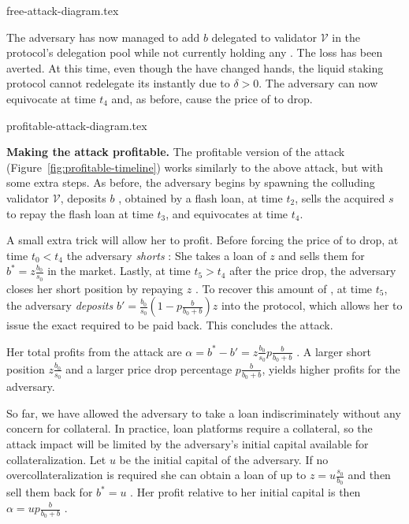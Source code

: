 \iflncs
  {free-attack-diagram.tex}
\fi

The adversary has now managed to add $b$ \asset delegated to validator $\mathcal{V}$
in the protocol's delegation pool while not currently holding
any \stasset. The loss has been averted.
At this time, even though the
\stassets have changed hands, the liquid staking protocol cannot redelegate
its \assets instantly due to $\delta > 0$.
The adversary can now equivocate at time $t_4$ and, as before, cause the
price of \stasset to drop.

{profitable-attack-diagram.tex}

\noindent
\textbf{Making the attack profitable.}
The profitable version of the attack (Figure~\ref{fig:profitable-timeline}) works similarly to the above
attack, but with some extra steps. As before, the adversary begins by spawning the
colluding validator $\mathcal{V}$, deposits $b$ \asset, obtained by a flash loan, at time $t_2$,
sells the acquired $s$ \stasset to repay the flash loan at time $t_3$, and equivocates at time $t_4$.


A small extra trick will allow her to profit.
Before forcing the price of \stasset to drop, at time $t_0 < t_4$
the adversary \emph{shorts}
\stasset: She takes a loan of $z$ \stassets and
sells them for $b^* = z \frac{b_0}{s_0}$ \asset in the market.
Lastly, at time $t_5 > t_4$ after the price drop, the adversary closes her short position by repaying $z$
\stasset.
To recover this amount of \stasset, at time $t_5$, the adversary \emph{deposits}
$b' = \frac{b_0}{s_0}(1 - p\frac{b}{b_0 + b}) z$ \asset
into the protocol, which allows her to issue the exact required \stasset
to be paid back. This concludes the attack.

Her total profits from the attack are
$\alpha = b^* - b' = z \frac{b_0}{s_0} p \frac{b}{b_0 + b}$ \asset.
A larger short position $z \frac{b_0}{s_0}$ and a larger
\stasset price drop percentage $p \frac{b}{b_0 + b}$, yields higher profits for the adversary.

So far, we have allowed the adversary to take a loan indiscriminately without
any concern for collateral. In practice, loan platforms
require a collateral, so the attack impact will be limited by the adversary's
initial capital available for collateralization.
Let $u$ \asset be the initial capital of the adversary.
If no overcollateralization is required she can obtain a
loan of up to $z = u \frac{s_0}{b_0}$ \stasset and
then sell them back for $b^* = u$ \asset.
Her profit relative to her initial capital is then
$\alpha = u p \frac{b}{b_0 + b}$ \asset.


